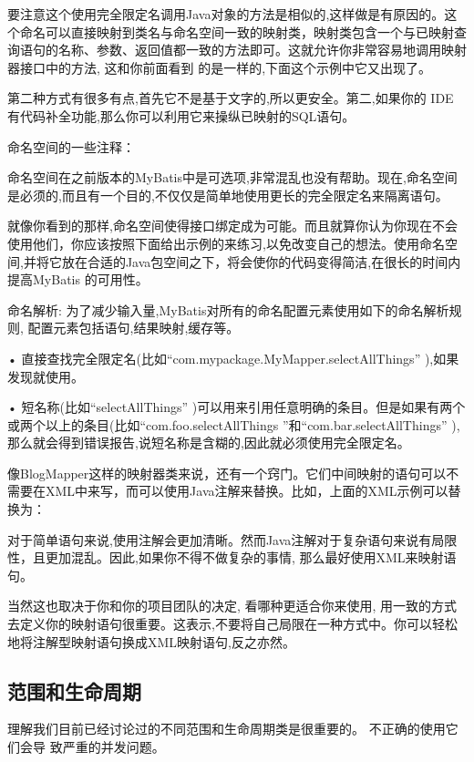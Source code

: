 

要注意这个使用完全限定名调用Java对象的方法是相似的,这样做是有原因的。这个命名可以直接映射到类名与命名空间一致的映射类，映射类包含一个与已映射查询语句的名称、参数、返回值都一致的方法即可。这就允许你非常容易地调用映射器接口中的方法, 这和你前面看到 的是一样的,下面这个示例中它又出现了。



第二种方式有很多有点,首先它不是基于文字的,所以更安全。第二,如果你的 IDE 有代码补全功能,那么你可以利用它来操纵已映射的SQL语句。

命名空间的一些注释：

命名空间在之前版本的MyBatis中是可选项,非常混乱也没有帮助。现在,命名空间是必须的,而且有一个目的,不仅仅是简单地使用更长的完全限定名来隔离语句。

就像你看到的那样,命名空间使得接口绑定成为可能。而且就算你认为你现在不会使用他们，你应该按照下面给出示例的来练习,以免改变自己的想法。使用命名空间,并将它放在合适的Java包空间之下，将会使你的代码变得简洁,在很长的时间内提高MyBatis 的可用性。

命名解析: 为了减少输入量,MyBatis对所有的命名配置元素使用如下的命名解析规则, 配置元素包括语句,结果映射,缓存等。

•   直接查找完全限定名(比如“com.mypackage.MyMapper.selectAllThings” ),如果发现就使用。

•   短名称(比如“selectAllThings” )可以用来引用任意明确的条目。但是如果有两个 或两个以上的条目(比如“com.foo.selectAllThings ”和“com.bar.selectAllThings” ), 那么就会得到错误报告,说短名称是含糊的,因此就必须使用完全限定名。

像BlogMapper这样的映射器类来说，还有一个窍门。它们中间映射的语句可以不需要在XML中来写，而可以使用Java注解来替换。比如，上面的XML示例可以替换为：



对于简单语句来说,使用注解会更加清晰。然而Java注解对于复杂语句来说有局限性，且更加混乱。因此,如果你不得不做复杂的事情, 那么最好使用XML来映射语句。

当然这也取决于你和你的项目团队的决定, 看哪种更适合你来使用, 用一致的方式去定义你的映射语句很重要。这表示,不要将自己局限在一种方式中。你可以轻松地将注解型映射语句换成XML映射语句,反之亦然。

\subsection{范围和生命周期}
理解我们目前已经讨论过的不同范围和生命周期类是很重要的。 不正确的使用它们会导 致严重的并发问题。
